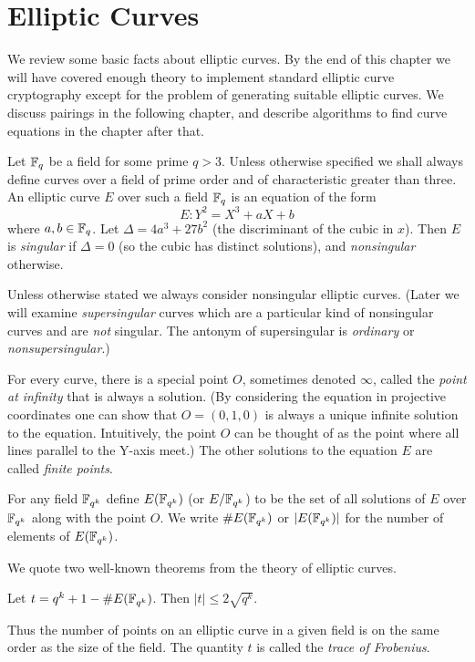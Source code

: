 \chapter {Elliptic Curves}
We review some basic facts about elliptic curves.
By the end of this chapter we will have covered enough theory to implement
standard elliptic curve cryptography except for the problem of generating
suitable elliptic curves.
We discuss pairings in the following chapter, and describe algorithms
to find curve equations in the chapter after that.

Let $\mathbb{F}_q$ be a field for some prime $q > 3$.
Unless otherwise specified we shall always
define curves over a field of prime order and of characteristic greater
than three.
An elliptic curve $E$ over such a field $\mathbb{F}_q$ is an equation of the form
\[ E: Y^2 = X^3 + a X + b \]
where $a, b \in \mathbb{F}_q$.
Let $\Delta = 4 a^3 + 27b^2$ (the discriminant of the cubic in $x$). Then
$E$ is \emph{singular} if $\Delta = 0$ (so the cubic has distinct solutions),
and \emph{nonsingular} otherwise.

Unless otherwise stated we always consider nonsingular elliptic curves.
(Later we will examine \emph{supersingular} curves which are a
particular kind of nonsingular curves and are \emph{not} singular.
The antonym of supersingular is \emph{ordinary} or \emph{nonsupersingular}.)

For every curve, there is a special point $O$, sometimes denoted $\infty$,
called the \emph{point at infinity}
that is always a solution. (By considering the equation in
projective coordinates one can show that $O = (0,1,0)$ is always a unique
infinite solution to the equation. Intuitively,
the point $O$ can be thought of as the point where all lines
parallel to the Y-axis meet.) The other solutions to the equation $E$
are called \emph{finite points}.

For any field $\mathbb{F}_{q^k}$ define $E(\mathbb{F}_{q^k})$ (or $E/\mathbb{F}_{q^k}$)
to be the set of all solutions
of $E$ over $\mathbb{F}_{q^k}$ along with the point $O$. We write $\#E(\mathbb{F}_{q^k})$ 
or $|E(\mathbb{F}_{q^k})|$ for
the number of elements of $E(\mathbb{F}_{q^k})$.

We quote two well-known theorems from the theory of elliptic curves.

\begin{theorem}
[Hasse] Let $t = q^k + 1 - \#E(\mathbb{F}_{q^k})$.
Then $|t| \le 2\sqrt{q^k}$.
\end{theorem}

Thus the number of points on an elliptic curve in a given field
is on the same order as the size of the field.
The quantity $t$ is called the \emph{trace of Frobenius}.

